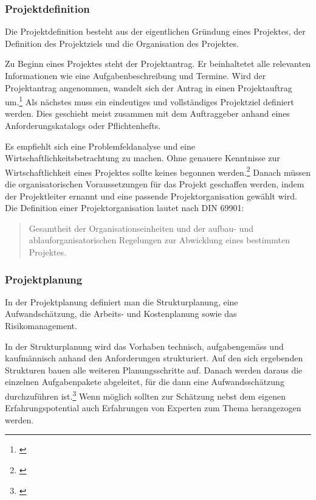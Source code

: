 \subsubsection{Projektdefinition}
Die Projektdefinition besteht aus der eigentlichen Gründung eines Projektes,
der Definition des Projektziels und die Organisation des Projektes.

Zu Beginn eines Projektes steht der Projektantrag. Er beinhaltetet alle relevanten
Informationen wie eine Aufgabenbeschreibung und Termine. Wird der Projektantrag
angenommen, wandelt sich der Antrag in einen Projektauftrag um.\footnote{\citealp*[Vgl.][S. 13]{burghardt2007einfuehrung}}
Als nächstes muss ein eindeutiges und vollständiges Projektziel definiert werden.
Dies geschieht meist zusammen mit dem Auftraggeber anhand eines Anforderungskatalogs
oder Pflichtenhefts.

Es empfiehlt sich eine Problemfeldanalyse und eine Wirtschaftlichkeitsbetrachtung
zu machen. Ohne genauere Kenntnisse zur Wirtschaftlichkeit eines Projektes sollte
keines begonnen werden.\footnote{\citealp*[Vgl.][S. 45]{burghardt2007einfuehrung}}
Danach müssen die organisatorischen Voraussetzungen für das Projekt geschaffen werden,
indem der Projektleiter ernannt und eine passende Projektorganisation gewählt wird.
Die Definition einer Projektorganisation lautet nach DIN 69901:

\begin{quote}
Gesamtheit der Organisationseinheiten und der aufbau- und ablauforganisatorischen
Regelungen zur Abwicklung eines bestimmten Projektes.
\end{quote}

\subsubsection{Projektplanung}
In der Projektplanung definiert man die Strukturplanung, eine Aufwandschätzung,
die Arbeits- und Kostenplanung sowie das Risikomanagement.

In der Strukturplanung wird das Vorhaben technisch, aufgabengemäss und kaufmännisch
anhand den Anforderungen strukturiert. Auf den sich ergebenden Strukturen bauen
alle weiteren Planungsschritte auf. Danach werden daraus die einzelnen Aufgabenpakete
abgeleitet, für die dann eine Aufwandsschätzung durchzuführen ist.\footnote{\citealp*[Vgl.][S. 14]{burghardt2007einfuehrung}}
Wenn möglich sollten zur Schätzung nebst dem eigenen Erfahrungspotential auch
Erfahrungen von Experten zum Thema herangezogen werden.


